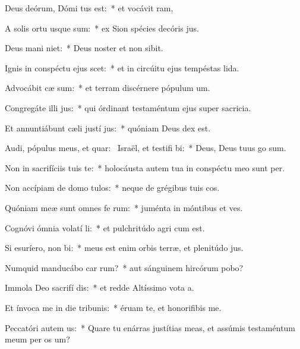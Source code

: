\item Deus deórum, Dómi tus est:~* et vocávit ram,
\item A solis ortu usque  sum:~* ex Sion spécies decóris jus.
\item Deus mani niet:~* Deus noster et non sibit.
\item Ignis in conspéctu ejus scet:~* et in circúitu ejus tempéstas lida.
\item Advocábit cæ sum:~* et terram discérnere pópulum um.
\item Congregáte illi  jus:~* qui órdinant testaméntum ejus super sacricia.
\item Et annuntiábunt cæli justí jus:~* quóniam Deus dex est.
\item Audi, pópulus meus, et quar:~\pscross{} Israël, et testifi bi:~* Deus, Deus tuus go sum.
\item Non in sacrifíciis tuis  te:~* holocáusta autem tua in conspéctu meo sunt per.
\item Non accípiam de domo  tulos:~* neque de grégibus tuis cos.
\item Quóniam meæ sunt omnes fe rum:~* juménta in móntibus et ves.
\item Cognóvi ómnia volatí li:~* et pulchritúdo agri cum est.
\item Si esuríero, non  bi:~* meus est enim orbis terræ, et plenitúdo jus.
\item Numquid manducábo car rum?~* aut sánguinem hircórum pobo?
\item Immola Deo sacrifí dis:~* et redde Altíssimo vota a.
\item Et ínvoca me in die tribunis:~* éruam te, et honorifibis me.
\item Peccatóri autem  us:~* Quare tu enárras justítias meas, et assúmis testaméntum meum per os um?
